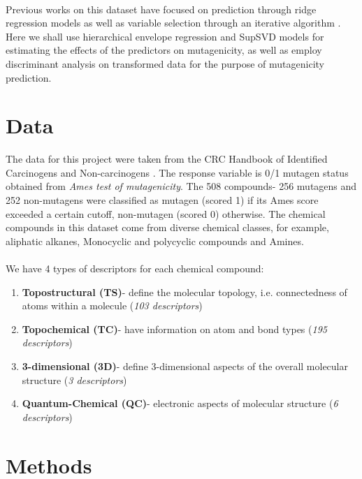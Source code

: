 \documentclass[11pt]{llncs}
\begin{document}
\paragraph{}Previous works on this dataset have focused on prediction through ridge regression models \cite{hawk} as well as variable selection through an iterative algorithm \cite{majum}. Here we shall use hierarchical envelope regression and SupSVD models for estimating the effects of the predictors on mutagenicity, as well as employ discriminant analysis on transformed data for the purpose of mutagenicity prediction.

\section{Data}
The data for this project were taken from the CRC Handbook of Identified Carcinogens and Non-carcinogens \cite{crc}. The response variable is 0/1 mutagen status obtained from \textit{Ames test of mutagenicity}. The 508 compounds- 256 mutagens and 252 non-mutagens were classified as mutagen (scored 1) if its Ames score exceeded a certain cutoff, non-mutagen (scored 0) otherwise. The chemical compounds in this dataset come from diverse chemical classes, for example, aliphatic alkanes, Monocyclic and polycyclic compounds and Amines.
\paragraph{}We have 4 types of descriptors for each chemical compound:
\begin{enumerate}
\item \textbf{Topostructural (TS)}- define the molecular topology, i.e. connectedness of atoms within a molecule (\textit{103 descriptors})
\item \textbf{Topochemical (TC)}- have information on atom and bond types (\textit{195 descriptors})
\item \textbf{3-dimensional (3D)}- define 3-dimensional aspects of the overall molecular structure (\textit{3 descriptors})
\item \textbf{Quantum-Chemical (QC)}- electronic aspects of molecular structure (\textit{6 descriptors})
\end{enumerate}

\section{Methods}
\end{document}
